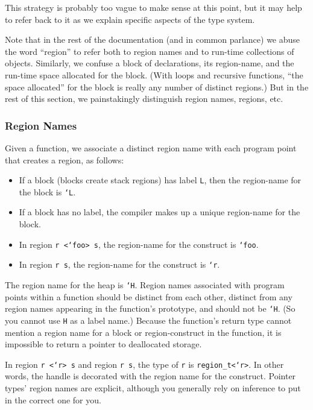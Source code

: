 This strategy is probably too vague to make sense at this point, but
it may help to refer back to it as we explain specific aspects of the
type system.

Note that in the rest of the documentation (and in common parlance) we
abuse the word ``region'' to refer both to region names and to
run-time collections of objects.  Similarly, we confuse a block of
declarations, its region-name, and the run-time space allocated for
the block.  (With loops and recursive functions, ``the space
allocated'' for the block is really any number of distinct regions.)
But in the rest of this section, we painstakingly distinguish
region names, regions, etc.

\subsubsection{Region Names}

Given a function, we associate a distinct region name with each
program point that creates a region, as follows:

\begin{itemize}
\item If a block (blocks create stack regions) has label \texttt{L},
  then the region-name for the block is \texttt{`L}.
\item If a block has no label, the compiler makes up a unique
  region-name for the block.
\item In region \texttt{r <`foo> s}, the region-name for the construct
  is \texttt{`foo}.
\item In region \texttt{r s}, the region-name for the construct is
  \texttt{`r}.
\end{itemize}

The region name for the heap is \texttt{`H}.  Region names associated
with program points within a function should be distinct from each
other, distinct from any region names appearing in the function's
prototype, and should not be \texttt{`H}.  (So you cannot use
\texttt{H} as a label name.)  Because the function's return type
cannot mention a region name for a block or region-construct in the
function, it is impossible to return a pointer to deallocated storage.

In region \texttt{r <`r> s} and region \texttt{r s}, the type of
\texttt{r} is \texttt{region_t<`r>}.  In other words, the handle is
decorated with the region name for the construct.  Pointer types'
region names are explicit, although you generally rely on inference to
put in the correct one for you.

